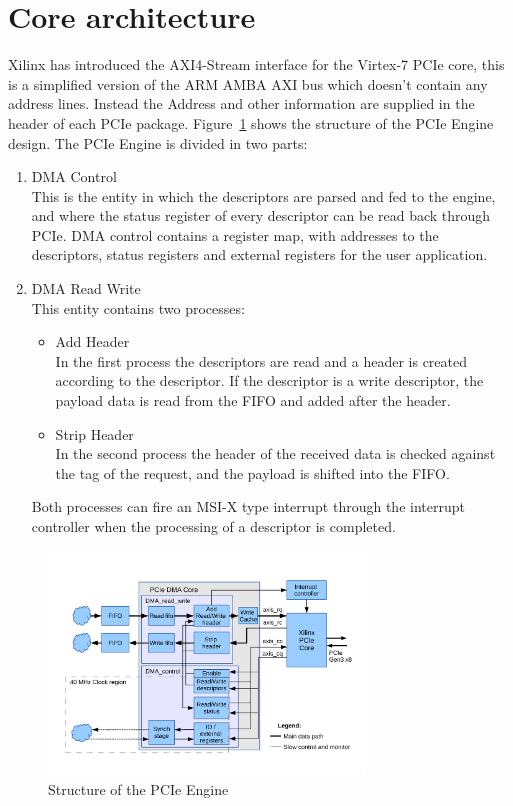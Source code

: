 \section{Core architecture}
Xilinx has introduced the AXI4-Stream interface \cite{ug761} for the Virtex-7 PCIe core, this is a simplified version of the ARM AMBA AXI bus \cite{arm}  which doesn't contain any address lines. Instead the Address and other information are supplied in the header of each PCIe package. Figure~\ref{fig:pcie_core_structure} shows the structure of the PCIe Engine design. The PCIe Engine is divided in two parts:
\begin{enumerate}
\item DMA Control \\This is the entity in which the descriptors are parsed and fed to the engine, and where the status register of every descriptor can be read back through PCIe. DMA control contains a register map, with addresses to the descriptors, status registers and external registers for the user application.
\item DMA Read Write \\This entity contains two processes:
\begin{itemize}
\item Add Header\\In the first process the descriptors are read and a header is created according to the descriptor. If the descriptor is a write descriptor, the payload data is read from the FIFO and added after the header.
\item Strip Header\\In the second process the header of the received data is checked against the tag of the request, and the payload is shifted into the FIFO.
\end{itemize}
Both processes can fire an MSI-X type interrupt through the interrupt controller when the processing of a descriptor is completed.
\end{enumerate}
\begin{figure}[H]
\centering
\includegraphics[trim=0mm 0cm 0mm 1cm,width=0.75\textwidth, page=1]{pictures/dma_core_structure.pdf}
\caption{Structure of the PCIe Engine}
\label{fig:pcie_core_structure}
\end{figure}
